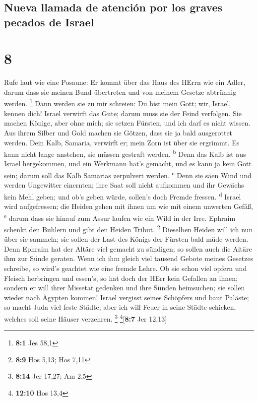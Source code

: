\hypertarget{nueva-llamada-de-atenciuxf3n-por-los-graves-pecados-de-israel}{%
\subsection{Nueva llamada de atención por los graves pecados de
Israel}\label{nueva-llamada-de-atenciuxf3n-por-los-graves-pecados-de-israel}}

\hypertarget{section-7}{%
\section{8}\label{section-7}}

 Rufe laut wie eine Posaune: Er kommt über das Haus des
HErrn wie ein Adler, darum dass sie meinen Bund übertreten und von
meinem Gesetze abtrünnig werden. \footnote{\textbf{8:1} Jes 58,1}
 Dann werden sie zu mir schreien: Du bist mein Gott; wir,
Israel, kennen dich!  Israel verwirft das Gute; darum muss
sie der Feind verfolgen.  Sie machen Könige, aber ohne
mich; sie setzen Fürsten, und ich darf es nicht wissen. Aus ihrem Silber
und Gold machen sie Götzen, dass sie ja bald ausgerottet werden.
 Dein Kalb, Samaria, verwirft er; mein Zorn ist über sie
ergrimmt. Es kann nicht lange anstehen, sie müssen gestraft werden.
\textsuperscript{b}  Denn das Kalb ist aus Israel
hergekommen, und ein Werkmann hat's gemacht, und es kann ja kein Gott
sein; darum soll das Kalb Samarias zerpulvert werden.
\textsuperscript{c}  Denn sie säen Wind und werden
Ungewitter einernten; ihre Saat soll nicht aufkommen und ihr Gewächs
kein Mehl geben; und ob's geben würde, sollen's doch Fremde fressen.
\textsuperscript{d}  Israel wird aufgefressen; die Heiden
gehen mit ihnen um wie mit einem unwerten Gefäß, \textsuperscript{e}
 darum dass sie hinauf zum Assur laufen wie ein Wild in
der Irre. Ephraim schenkt den Buhlern und gibt den Heiden Tribut.
\footnote{\textbf{8:9} Hos 5,13; Hos 7,11}  Dieselben
Heiden will ich nun über sie sammeln; sie sollen der Last des Königs der
Fürsten bald müde werden.  Denn Ephraim hat der Altäre
viel gemacht zu sündigen; so sollen auch die Altäre ihm zur Sünde
geraten.  Wenn ich ihm gleich viel tausend Gebote meines
Gesetzes schreibe, so wird's geachtet wie eine fremde Lehre.
 Ob sie schon viel opfern und Fleisch herbringen und
essen's, so hat doch der HErr kein Gefallen an ihnen; sondern er will
ihrer Missetat gedenken und ihre Sünden heimsuchen; sie sollen wieder
nach Ägypten kommen!  Israel vergisst seines Schöpfers
und baut Paläste; so macht Juda viel feste Städte; aber ich will Feuer
in seine Städte schicken, welches soll seine Häuser verzehren.
\footnote{\textbf{8:14} Jer 17,27; Am 2,5} \footnote{\textbf{12:10} Hos
  13,4}{[}\textbf{8:7} Jer 12,13{]}

